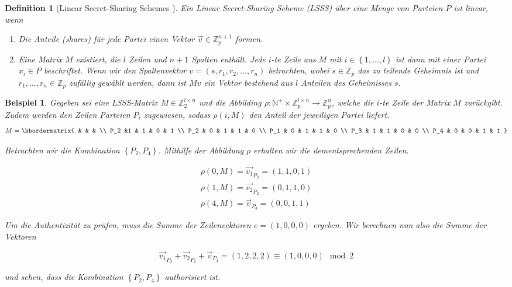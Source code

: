 \documentclass{hsflensburg}
\newtheorem{definition}{Definition}
\newtheorem*{example}{Beispiel}
\begin{document}
	\begin{definition}[Linear Secret-Sharing Schemes \cite{abe}]
		Ein Linear Secret-Sharing Scheme (LSSS) über eine Menge von Parteien $P$ ist
		linear, wenn

		\begin{enumerate}
			\item Die Anteile (shares) für jede Partei einen Vektor $\vec{v} \in
				\mathbb{Z}_p^{n+1}$ formen.
			\item Eine Matrix $M$ existiert, die $l$ Zeilen und $n+1$ Spalten enthält.
				Jede $i$-te Zeile aus $M$ mit $i \in \left\{1, ..., l\right\}$ ist dann
				mit einer Partei $x_i \in P$ beschriftet. Wenn wir den Spaltenvektor $v =
				\left(s, r_1, r_2, ..., r_n\right)$ betrachten, wobei $s \in \mathbb{Z}_p$ das zu
				teilende Geheimnis ist und $r_1, ..., r_n \in \mathbb{Z}_p$ zufällig
				gewählt werden, dann ist $Mv$ ein Vektor bestehend aus $l$ Anteilen des
				Geheimisses $s$.
		\end{enumerate}
	\end{definition}

	\begin{example}
		Gegeben sei eine LSSS-Matrix $M \in \mathbb{Z}_2^{l \times n}$ und die Abbilding $\rho : \mathbb{N^+}
		\times \mathbb{Z}_p^{l \times n} \to \mathbb{Z}_p^n$, welche die
		$i$-te Zeile der Matrix $M$ zurückgibt. Zudem werden den Zeilen Parteien
		$P_i$ zugewiesen, sodass $\rho(i, M)$ den Anteil der jeweiligen Partei liefert.
		$$M = \kbordermatrix{
				  &   &   &   \\
			P_2 &1 & 1 & 0 & 1 \\
			P_2 &	0 & 1 & 1 & 0 \\
			P_1 &	0 & 1 & 1 & 0 \\
			P_3 &	1 & 1 & 0 & 0 \\
			P_4 &	0 & 0 & 1 & 1
			}$$

		Betrachten wir die Kombination $\left\{ P_2, P_4 \right\}$. Mithilfe der
		Abbildung $\rho$ erhalten wir die dementsprechenden Zeilen.

		\begin{align*}
			\rho\left(0, M\right) = \vec{v_1}_{P_2} = \left(1, 1, 0, 1\right) \\
			\rho\left(1, M\right) = \vec{v_2}_{P_2} = \left(0, 1, 1, 0\right) \\
			\rho\left(4, M\right) = \vec{v}_{P_4} = \left(0, 0, 1, 1\right)
		\end{align*}

		Um die Authentizität zu prüfen, muss die Summe der Zeilenvektoren $e =
		\left(1, 0, 0, 0\right)$ ergeben. Wir berechnen nun also die Summe der
		Vektoren
		
		$$\vec{v_1}_{P_2} + \vec{v_2}_{P_2} + \vec{v}_{P_4} = (1, 2, 2, 2) \equiv
		(1, 0, 0, 0) \mod 2$$

		und sehen, dass die Kombination $\left\{P_2, P_4\right\}$ authorisiert ist.
	\end{example}
\end{document}
